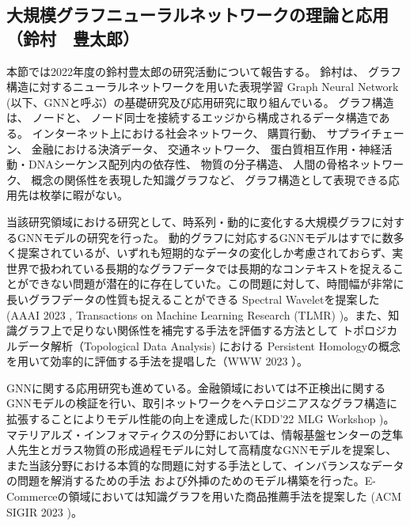 
\subsection{大規模グラフニューラルネットワークの理論と応用（鈴村　豊太郎）}

本節では2022年度の鈴村豊太郎の研究活動について報告する。 鈴村は、 グラフ構造に対するニューラルネットワークを用いた表現学習 Graph Neural Network (以下、GNNと呼ぶ）の基礎研究及び応用研究に取り組んでいる。 グラフ構造は、 ノードと、 ノード同士を接続するエッジから構成されるデータ構造である。 インターネット上における社会ネットワーク、 購買行動、 サプライチェーン、 金融における決済データ、 交通ネットワーク、 蛋白質相互作用・神経活動・DNAシーケンス配列内の依存性、 物質の分子構造、 人間の骨格ネットワーク、 概念の関係性を表現した知識グラフなど、 グラフ構造として表現できる応用先は枚挙に暇がない。
\par
当該研究領域における研究として、時系列・動的に変化する大規模グラフに対するGNNモデルの研究を行った。
動的グラフに対応するGNNモデルはすでに数多く提案されているが、いずれも短期的なデータの変化しか考慮されておらず、実世界で扱われている長期的なグラフデータでは長期的なコンテキストを捉えることができない問題が潜在的に存在していた。この問題に対して、時間幅が非常に長いグラフデータの性質も捉えることができる Spectral Waveletを提案した(AAAI 2023 \cite{aaai-deft}, Transactions on Machine Learning Research (TLMR) \cite{feta})。また、知識グラフ上で足りない関係性を補完する手法を評価する方法として トポロジカルデータ解析（Topological Data Analysis) における Persistent Homologyの概念を用いて効率的に評価する手法を提唱した（WWW 2023 \cite{kg-kp}）。

GNNに関する応用研究も進めている。金融領域においては不正検出に関するGNNモデルの検証を行い、取引ネットワークをヘテロジニアスなグラフ構造に拡張することによりモデル性能の向上を達成した(KDD'22 MLG Workshop \cite{eth-gnn})。マテリアルズ・インフォマティクスの分野においては、情報基盤センターの芝隼人先生とガラス物質の形成過程モデルに対して高精度なGNNモデルを提案し\cite{botan}、また当該分野における本質的な問題に対する手法として、インバランスなデータの問題を解消するための手法 \cite{xsig-limin}および外挿のためのモデル構築を行った\cite{xsig-takashige}。E-Commerceの領域においては知識グラフを用いた商品推薦手法を提案した (ACM SIGIR 2023 \cite{sigir})。

